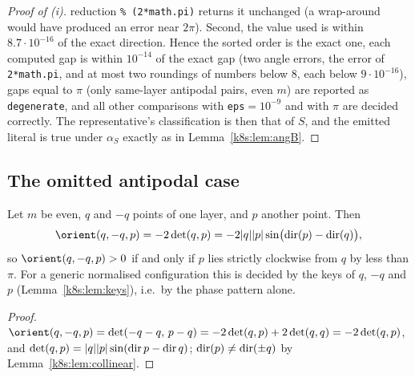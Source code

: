 \begin{proof}[Proof of (i)]
reduction \texttt{\%~(2*math.pi)} returns it unchanged (a wrap-around would have produced an error near $2\pi$).
Second, the value used is within $8.7\cdot10^{-16}$ of the exact direction. Hence the sorted order is
the exact one, each computed gap is within $10^{-14}$ of the exact gap (two angle errors, the error of
\texttt{2*math.pi}, and at most two roundings of numbers below $8$, each below $9\cdot10^{-16}$), gaps equal to $\pi$ (only same-layer antipodal
pairs, even $m$) are reported as \texttt{degenerate}, and all other comparisons with \texttt{eps}$=10^{-9}$ and with $\pi$
are decided correctly. The representative's classification is then that of $S$, and the emitted literal is true under
$\alpha_S$ exactly as in Lemma~\ref{k8s:lem:angB}.
\end{proof}

\subsection{The omitted antipodal case}\label{k8s:sec:antipodal}

\begin{lemma}\label{k8s:lem:diam}
Let $m$ be even, $q$ and $-q$ points of one layer, and $p$ another point. Then
\[
\orient(q,-q,p)=-2\det(q,p)=-2|q||p|\sin\bigl(\dirv(p)-\dirv(q)\bigr),
\]
so $\orient(q,-q,p)>0$ if and only if $p$ lies strictly clockwise from $q$ by less than $\pi$. For a generic normalised
configuration this is decided by the keys of $q$, $-q$ and $p$ (Lemma~\ref{k8s:lem:keys}), i.e.\ by the phase pattern
alone.
\end{lemma}

\begin{proof}
$\orient(q,-q,p)=\det(-q-q,\,p-q)=-2\det(q,p)+2\det(q,q)=-2\det(q,p)$, and $\det(q,p)=|q||p|\sin(\operatorname{dir} p-\operatorname{dir} q)$;
$\operatorname{dir}(p)\ne\operatorname{dir}(\pm q)$ by Lemma~\ref{k8s:lem:collinear}.
\end{proof}

